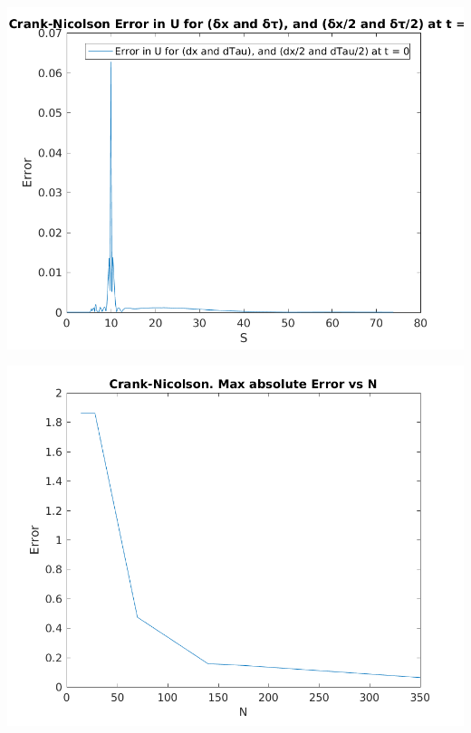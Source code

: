 \documentclass{article}
\begin{document}
\includegraphics{"q2_7"}
\pagebreak


\includegraphics{"q2_8"}
\pagebreak
\end{document}
